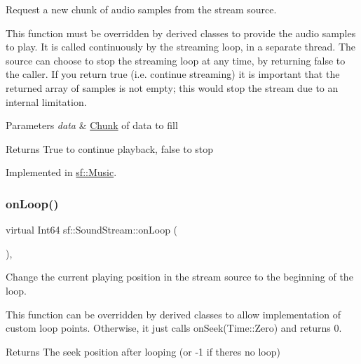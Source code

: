 Request a new chunk of audio samples from the stream source. 

This function must be overridden by derived classes to provide the audio samples to play. It is called continuously by the streaming loop, in a separate thread. The source can choose to stop the streaming loop at any time, by returning false to the caller. If you return true (i.\+e. continue streaming) it is important that the returned array of samples is not empty; this would stop the stream due to an internal limitation.


\begin{DoxyParams}{Parameters}
{\em data} & \mbox{\hyperlink{structsf_1_1_sound_stream_1_1_chunk}{Chunk}} of data to fill\\
\hline
\end{DoxyParams}
\begin{DoxyReturn}{Returns}
True to continue playback, false to stop \begin{DoxyVerb}\end{DoxyVerb}
 
\end{DoxyReturn}


Implemented in \mbox{\hyperlink{classsf_1_1_music_aca1bcb4e5d56a854133e74bd86374463}{sf\+::\+Music}}.

\mbox{\label{classsf_1_1_sound_stream_a3f717d18846f261fc375d71d6c7e41da}} 
\subsubsection{\texorpdfstring{onLoop()}{onLoop()}}
{\footnotesize\ttfamily virtual Int64 sf\+::\+Sound\+Stream\+::on\+Loop (\begin{DoxyParamCaption}{ }\end{DoxyParamCaption})\hspace{0.3cm}{\ttfamily [protected]}, {\ttfamily [virtual]}}



Change the current playing position in the stream source to the beginning of the loop. 

This function can be overridden by derived classes to allow implementation of custom loop points. Otherwise, it just calls on\+Seek(\+Time\+::\+Zero) and returns 0.

\begin{DoxyReturn}{Returns}
The seek position after looping (or -\/1 if there\textquotesingle{}s no loop) \begin{DoxyVerb}\end{DoxyVerb}
 
\end{DoxyReturn}


